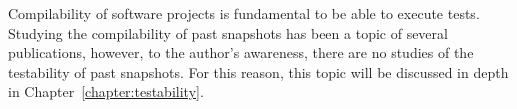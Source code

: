Compilability of software projects is fundamental to be able to execute tests. %
Studying the compilability of past snapshots has been a topic of several publications, however, to the author's awareness, there are no studies of the testability of past snapshots. 
For this reason, this topic will be discussed in depth in Chapter~\ref{chapter:testability}.



